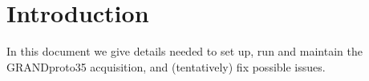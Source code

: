\section{Introduction} 
In this document we give details needed to set up, run and maintain the GRANDproto35 acquisition, and (tentatively) fix possible issues.
